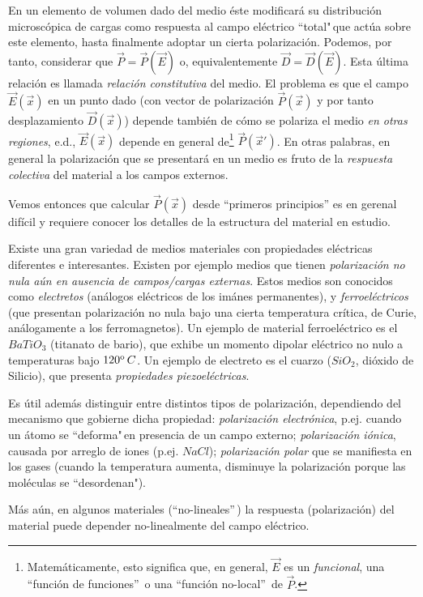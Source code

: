 En un elemento de volumen dado del medio éste modificará su distribución microscópica de cargas como respuesta al campo eléctrico ``total"\,que actúa sobre este elemento, hasta finalmente adoptar un cierta polarización. Podemos, por tanto, considerar que $\vec{P}=\vec{P}(\vec{E})$ o, equivalentemente
$\vec{D}=\vec{D}(\vec{E})$. Esta última relación es llamada
\textit{relación constitutiva} del medio. El problema es que el campo
$\vec{E}(\vec{x})$ en un punto dado (con vector de polarización $\vec{P}(\vec{x})$ y
por tanto desplazamiento $\vec{D}(\vec{x})$) depende también de cómo se
polariza el medio \textit{en otras regiones}, e.d., $\vec{E}(\vec{x})$ depende
en general de\footnote{Matemáticamente, esto significa que, en
general, $\vec{E}$ es un \textit{funcional}, una ``función de funciones''\, o
una ``función no-local''\, de $\vec{P}$.} $\vec{P}(\vec{x}')$.
En otras palabras, en general la polarización que se presentará en un medio es fruto de la  \textit{respuesta colectiva} del material a los campos externos.

 Vemos entonces que calcular $\vec{P}(\vec{x})$ desde ``primeros principios'' es en gerenal difícil y requiere conocer los detalles de la estructura del material en estudio.

Existe una gran variedad de medios materiales con propiedades eléctricas
diferentes e interesantes. Existen por ejemplo medios que tienen \textit{polarización
no nula aún en ausencia de campos/cargas externas}. Estos medios son conocidos
como \textit{electretos} (análogos eléctricos de los imánes permanentes), y 
\textit{ferroeléctricos} (que presentan polarización no nula bajo una cierta
temperatura crítica, de Curie, análogamente a los ferromagnetos). Un ejemplo
de material ferroeléctrico es el $BaTiO_3$ (titanato de bario), que exhibe un
momento dipolar eléctrico no nulo a temperaturas bajo $120^{\rm o}\,C$. Un ejemplo de electreto es el cuarzo ($SiO_2$, dióxido de Silicio), que presenta \textit{propiedades piezoeléctricas}.

Es útil además distinguir entre distintos tipos de polarización, dependiendo del mecanismo que gobierne dicha propiedad: \textit{polarización electrónica}, p.ej. cuando un átomo se ``deforma"\,en presencia de un campo externo; \textit{polarización iónica}, causada por arreglo de iones (p.ej. $NaCl$); \textit{polarización polar} que se manifiesta en los gases (cuando la
temperatura aumenta, disminuye la polarización porque las moléculas se
``desordenan").

Más aún, en algunos materiales (``no-lineales''\,) la respuesta
(polarización) del material puede depender no-linealmente del campo eléctrico.

